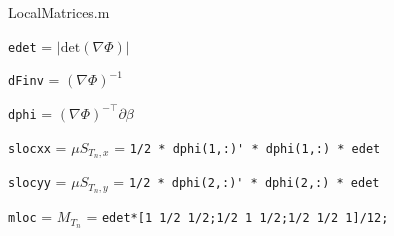 \noindent LocalMatrices.m

\verb|edet| = $\vert \mathrm{det} \left(\nabla \Phi \right) \vert$

\verb|dFinv| = $\left(\nabla \Phi \right)^{-1}$

\verb|dphi| = $\left(\nabla \Phi \right)^{-\top} \partial \beta$

\verb|slocxx| = $\mu S_{T_n,x}$ = \verb|1/2 * dphi(1,:)' * dphi(1,:) * edet|

\verb|slocyy| = $\mu S_{T_n,y}$ = \verb|1/2 * dphi(2,:)' * dphi(2,:) * edet|

\verb|mloc| = $M_{T_n}$ = \verb|edet*[1 1/2 1/2;1/2 1 1/2;1/2 1/2 1]/12;|


